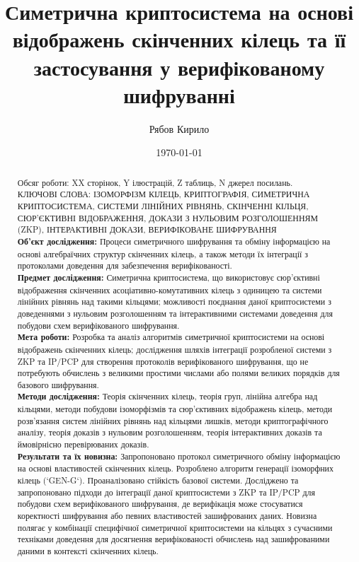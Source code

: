 \documentclass[a4paper,12pt]{article}
\title{Симетрична криптосистема на основі відображень скінченних кілець та її застосування у верифікованому шифруванні} %
\author{Рябов Кирило}
\date{\today}
\begin{document}
    \maketitle

    \begin{abstract}
        Обсяг роботи: XX сторінок, Y ілюстрацій, Z таблиць, N джерел посилань. \\ %
        КЛЮЧОВІ СЛОВА: ІЗОМОРФІЗМ КІЛЕЦЬ, КРИПТОГРАФІЯ, СИМЕТРИЧНА КРИПТОСИСТЕМА, СИСТЕМИ ЛІНІЙНИХ РІВНЯНЬ, СКІНЧЕННІ КІЛЬЦЯ, СЮР'ЄКТИВНІ ВІДОБРАЖЕННЯ, ДОКАЗИ З НУЛЬОВИМ РОЗГОЛОШЕННЯМ (ZKP), ІНТЕРАКТИВНІ ДОКАЗИ, ВЕРИФІКОВАНЕ ШИФРУВАННЯ \\ %
        \textbf{Об'єкт дослідження:} Процеси симетричного шифрування та обміну інформацією на основі алгебраїчних структур скінченних кілець, а також методи їх інтеграції з протоколами доведення для забезпечення верифікованості. \\ %
        \textbf{Предмет дослідження:} Симетрична криптосистема, що використовує сюр'єктивні відображення скінченних асоціативно-комутативних кілець з одиницею та системи лінійних рівнянь над такими кільцями; можливості поєднання даної криптосистеми з доведеннями з нульовим розголошенням та інтерактивними системами доведення для побудови схем верифікованого шифрування. \\ %
        \textbf{Мета роботи:} Розробка та аналіз алгоритмів симетричної криптосистеми на основі відображень скінченних кілець; дослідження шляхів інтеграції розробленої системи з ZKP та IP/PCP для створення протоколів верифікованого шифрування, що не потребують обчислень з великими простими числами або полями великих порядків для базового шифрування. \\ %
        \textbf{Методи дослідження:} Теорія скінченних кілець, теорія груп, лінійна алгебра над кільцями, методи побудови ізоморфізмів та сюр'єктивних відображень кілець, методи розв'язання систем лінійних рівнянь над кільцями лишків, методи криптографічного аналізу, теорія доказів з нульовим розголошенням, теорія інтерактивних доказів та ймовірнісно перевірюваних доказів. \\ %
        \textbf{Результати та їх новизна:} Запропоновано протокол симетричного обміну інформацією на основі властивостей скінченних кілець. Розроблено алгоритм генерації ізоморфних кілець (`GEN-G`). Проаналізовано стійкість базової системи. Досліджено та запропоновано підходи до інтеграції даної криптосистеми з ZKP та IP/PCP для побудови схем верифікованого шифрування, де верифікація може стосуватися коректності шифрування або певних властивостей зашифрованих даних. Новизна полягає у комбінації специфічної симетричної криптосистеми на кільцях з сучасними техніками доведення для досягнення верифікованості обчислень над зашифрованими даними в контексті скінченних кілець. \\ %

\end{abstract}
\end{document}
